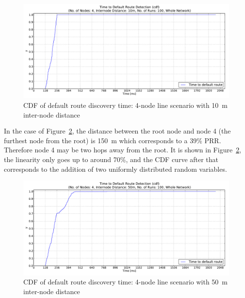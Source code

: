 \begin{figure}[htbp]
  \begin{center}
    \leavevmode
      \includegraphics[scale=0.38]
      {Pics/results/4/MRHOF/line/dist10_montecarlo_cdf_hist.pdf}
   \caption{CDF of default route discovery time: 4-node line scenario with 10~m inter-node distance}
    \label{fig:dist10_montecarlo_cdf_hist}
  \end{center}
\end{figure}


In the case of Figure~\ref{fig:dist50_montecarlo_cdf_hist}, the distance between the root node and node 4 (the furthest node from the root) is 150~m which corresponds to a 39\% PRR. Therefore node 4 may be two hops away from the root. It is shown in Figure~\ref{fig:dist50_montecarlo_cdf_hist}, the linearity only goes up to around 70\%, and the CDF curve after that corresponds to the addition of two uniformly distributed random variables.

\begin{figure}[htbp]
  \begin{center}
    \leavevmode
      \includegraphics[scale=0.38]
      {Pics/results/4/MRHOF/line/dist50_montecarlo_cdf_hist.pdf}
   \caption{CDF of default route discovery time: 4-node line scenario with 50~m inter-node distance}
    \label{fig:dist50_montecarlo_cdf_hist}
  \end{center}
   \vspace{-20pt}
\end{figure}

